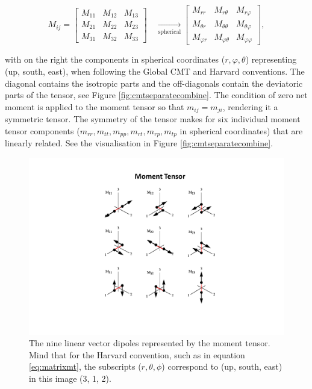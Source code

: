 \documentclass[../Text/00main.tex]{subfiles}
\begin{document}
\begin{equation}
M_{i j}=\left[\begin{array}{lll}M_{11} & M_{12} & M_{13} \\ M_{21} & M_{22} & M_{23} \\ M_{31} & M_{32} & M_{33}\end{array}\right] 
\quad 
\xrightarrow[\text{spherical}] 
\qquad 
\left[\begin{array}{lll}M_{r r} & M_{r \theta} & M_{r \varphi} \\ M_{\theta r} & M_{\theta \theta} & M_{\theta \varphi} \\ M_{\varphi r} & M_{\varphi \theta} & M_{\varphi \varphi}\end{array}\right],
\label{eq:matrixmt}
\end{equation}


with on the right the components in spherical coordinates ($r, \varphi, \theta$) representing (up, south, east), when following the Global CMT and Harvard conventions. The diagonal contains the isotropic parts and the off-diagonals contain the deviatoric parts of the tensor, see Figure \ref{fig:cmtseparatecombine}. The condition of zero net moment is applied to the moment tensor so that $m_{ij}=m_{ji}$, rendering it a symmetric tensor. The symmetry of the tensor makes for six individual moment tensor components ($m_{rr}, m_{tt}, m_{pp}, m_{rt}, m_{rp}, m_{tp}$ in spherical coordinates) that are linearly related. See the visualisation in Figure \ref{fig:cmtseparatecombine}. 

\begin{figure}[htb!]
    \centering
    \includegraphics[width=.5\linewidth, trim = 6cm 3cm 5cm 3cm, clip]{images_methods/Stress-and-Moment-Tensors.png}
    \caption{The nine linear vector dipoles represented by the moment tensor. Mind that for the Harvard convention, such as in equation \ref{eq:matrixmt}, the subscripts ($r, \theta, \phi$) correspond to (up, south, east) in this image (3, 1, 2). }
    \label{fig:mtcomponents}
\end{figure}
\end{document}
